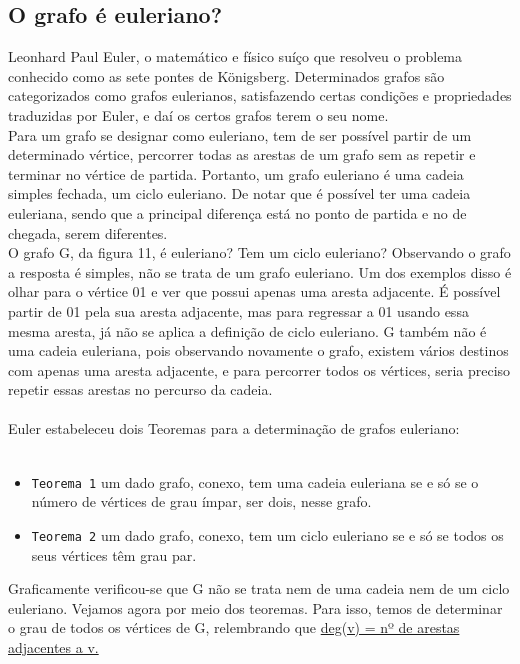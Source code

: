 \subsection{O grafo é euleriano?}
\indent Leonhard Paul Euler, o matemático e físico suíço que resolveu o problema conhecido como as sete pontes de Königsberg. 
Determinados grafos são categorizados como grafos eulerianos, satisfazendo certas condições
e propriedades traduzidas por Euler, e daí os certos grafos terem o seu nome.\\
\indent Para um grafo se designar como euleriano, tem de ser possível partir de um determinado vértice,
percorrer todas as arestas de um grafo sem as repetir e terminar no vértice de partida. Portanto, um grafo 
euleriano é uma cadeia simples fechada, um ciclo euleriano. De notar que é possível ter uma cadeia euleriana, 
sendo que a principal diferença está no ponto de partida e no de chegada, serem diferentes.\\
\indent O grafo G, da figura 11, é euleriano? Tem um ciclo euleriano? Observando o grafo a resposta é simples, 
não se trata de um grafo euleriano. Um dos exemplos disso é olhar para o vértice 01 e ver que possui apenas 
uma aresta adjacente. É possível partir de 01 pela sua aresta adjacente, mas para regressar a 01 usando essa 
mesma aresta, já não se aplica a definição de ciclo euleriano. G também não é uma cadeia euleriana, pois
observando novamente o grafo, existem vários destinos com apenas uma aresta adjacente, e para percorrer 
todos os vértices, seria preciso repetir essas arestas no percurso da cadeia.\\
\\
\indent Euler estabeleceu dois Teoremas para a determinação de grafos euleriano:\\
\\
\begin{itemize}
\item 
\verb|Teorema 1| um dado grafo, conexo, tem uma cadeia euleriana se e só se o número de vértices de grau ímpar, ser dois, nesse grafo.
\item 
\verb|Teorema 2| um dado grafo, conexo, tem um ciclo euleriano se e só se todos os seus vértices têm grau par.
\end{itemize}
\indent Graficamente verificou-se que G não se trata nem de uma cadeia nem de um ciclo euleriano. Vejamos 
agora por meio dos teoremas. Para isso, temos de determinar o grau de todos os vértices de G, relembrando 
que \underline{deg(v) = nº de arestas adjacentes a v.} \\

